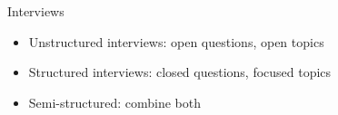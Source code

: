 \begin{Slide}{Interviews}
\begin{itemize}
\item Unstructured interviews: open questions, open topics
\item Structured interviews: closed questions, focused topics
\item Semi-structured: combine both


\end{itemize}
\end{Slide}